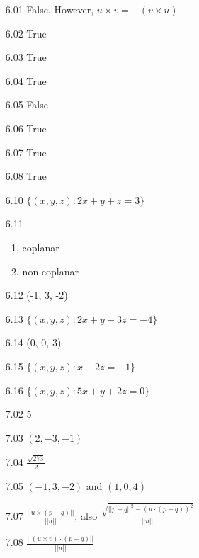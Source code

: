 \documentclass{article}
\begin{document}
\begin{enumerate}
  \item[6.01] False. However, $u \times v = -(v \times u)$
  \item[6.02] True
  \item[6.03] True
  \item[6.04] True
  \item[6.05] False
  \item[6.06] True
  \item[6.07] True
  \item[6.08] True
  \item[6.10] $\{ (x,y,z): 2x+y+z = 3\}$
  \item[6.11]
    \begin{enumerate}[\hspace{0.5cm}(a)]
      \item coplanar
      \item non-coplanar
    \end{enumerate}
  \item[6.12] (-1, 3, -2)
  \item[6.13] $\{ (x,y,z): 2x+y-3z = -4\}$
  \item[6.14] (0, 0, 3)
  \item[6.15] $\{ (x,y,z): x-2z = -1\}$
  \item[6.16] $\{ (x,y,z): 5x+y+2z = 0\}$
\end{enumerate}
\vspace{0.5cm}

\begin{enumerate}
  \item[7.02] $5$
  \item[7.03] $(2, -3, -1)$
  \item[7.04] $\frac{\sqrt{273}}{2}$
  \item[7.05] $(-1, 3, -2)$ and $(1, 0, 4)$
  \item[7.07] $\frac{ \vert \vert u \times (p-q) \vert \vert }{ \vert \vert u \vert \vert }$; also $\frac{ \sqrt{\vert \vert p-q \vert \vert ^2 - (u \cdot (p-q))^2} }{ \vert \vert u \vert \vert }$
  \item[7.08] $\frac{ \vert \vert (u \times v) \cdot (p-q) \vert \vert }{ \vert \vert u \vert \vert }$
\end{enumerate}
\end{document}
